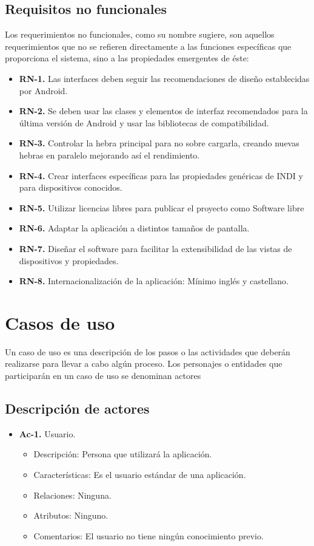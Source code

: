\subsection{Requisitos no funcionales}

Los requerimientos no funcionales, como su nombre sugiere, son aquellos requerimientos que no se refieren directamente a las funciones específicas que proporciona el sistema, sino a las propiedades emergentes de éste:

\begin{itemize}
  \item \textbf{RN-1.} Las interfaces deben seguir las recomendaciones de diseño establecidas por Android.
  \item \textbf{RN-2.} Se deben usar las clases y elementos de interfaz recomendados para la última versión de Android y usar las bibliotecas de compatibilidad.
  \item \textbf{RN-3.} Controlar la hebra principal para no sobre cargarla, creando nuevas hebras en paralelo mejorando así el rendimiento.
  \item \textbf{RN-4.} Crear interfaces específicas para las propiedades genéricas de INDI y para dispositivos conocidos.
  \item \textbf{RN-5.} Utilizar licencias libres para publicar el proyecto como Software libre
  \item \textbf{RN-6.} Adaptar la aplicación a distintos tamaños de pantalla.
  \item \textbf{RN-7.} Diseñar el software para facilitar la extensibilidad de las vistas de dispositivos y propiedades.
  \item \textbf{RN-8.} Internacionalización de la aplicación: Mínimo inglés y castellano.
\end{itemize}

\section{Casos de uso}

Un caso de uso es una descripción de los pasos o las actividades que deberán realizarse para llevar a cabo algún proceso. Los personajes o entidades que participarán en un caso de uso se denominan actores

\subsection{Descripción de actores}

\begin{itemize}
  \item \textbf{Ac-1.} Usuario.
  \begin{itemize}
   \item Descripción: Persona que utilizará la aplicación.
   \item Características: Es el usuario estándar de una aplicación.
   \item Relaciones: Ninguna.
   \item Atributos: Ninguno.
   \item Comentarios: El usuario no tiene ningún conocimiento previo.
  \end{itemize}
\end{itemize}

